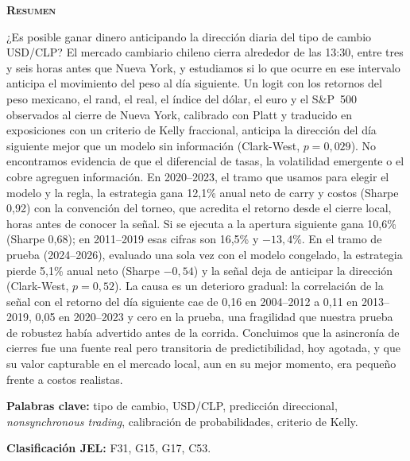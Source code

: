 \documentclass[11pt,a4paper]{article}
\begin{document}
\begin{center}
\begin{minipage}{0.86\textwidth}
\small
\begin{center}\textbf{\scshape Resumen}\end{center}
\vspace{-0.2cm}
\noindent ¿Es posible ganar dinero anticipando la dirección diaria del tipo de cambio USD/CLP? El mercado cambiario chileno cierra alrededor de las 13:30, entre tres y seis horas antes que Nueva York, y estudiamos si lo que ocurre en ese intervalo anticipa el movimiento del peso al día siguiente. Un logit con los retornos del peso mexicano, el rand, el real, el índice del dólar, el euro y el S\&P~500 observados al cierre de Nueva York, calibrado con Platt y traducido en exposiciones con un criterio de Kelly fraccional, anticipa la dirección del día siguiente mejor que un modelo sin información (Clark-West, \(p=0{,}029\)). No encontramos evidencia de que el diferencial de tasas, la volatilidad emergente o el cobre agreguen información. En 2020--2023, el tramo que usamos para elegir el modelo y la regla, la estrategia gana 12,1\% anual neto de carry y costos (Sharpe 0,92) con la convención del torneo, que acredita el retorno desde el cierre local, horas antes de conocer la señal. Si se ejecuta a la apertura siguiente gana 10,6\% (Sharpe 0,68); en 2011--2019 esas cifras son 16,5\% y $-13{,}4$\%. En el tramo de prueba (2024--2026), evaluado una sola vez con el modelo congelado, la estrategia pierde 5,1\% anual neto (Sharpe $-0{,}54$) y la señal deja de anticipar la dirección (Clark-West, \(p=0{,}52\)). La causa es un deterioro gradual: la correlación de la señal con el retorno del día siguiente cae de 0,16 en 2004--2012 a 0,11 en 2013--2019, 0,05 en 2020--2023 y cero en la prueba, una fragilidad que nuestra prueba de robustez había advertido antes de la corrida. Concluimos que la asincronía de cierres fue una fuente real pero transitoria de predictibilidad, hoy agotada, y que su valor capturable en el mercado local, aun en su mejor momento, era pequeño frente a costos realistas.

\vspace{0.4cm}
\noindent\textbf{Palabras clave:} tipo de cambio, USD/CLP, predicción direccional, \emph{nonsynchronous trading}, calibración de probabilidades, criterio de Kelly.

\noindent\textbf{Clasificación JEL:} F31, G15, G17, C53.
\end{minipage}
\end{center}
\end{document}
